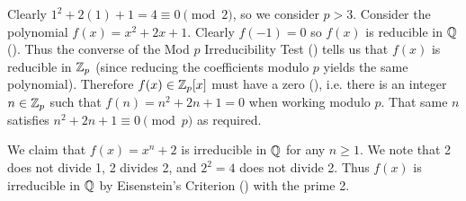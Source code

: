 \begin{questions}
    \item Clearly $1^2 + 2(1) + 1 = 4 \equiv 0 \pmod2$, so we consider $p > 3$. Consider the polynomial $f(x) = x^2 + 2x + 1$. Clearly $f(-1) = 0$ so $f(x)$ is reducible in $\mathbb{Q}$ (). Thus the converse of the Mod $p$ Irreducibility Test () tells us that $f(x)$ is reducible in $\mathbb{Z}_p$ (since reducing the coefficients modulo $p$ yields the same polynomial). Therefore $f(x) \in \mathbb{Z}_p[x]$ must have a zero (), i.e. there is an integer $n \in \mathbb{Z}_p$ such that $f(n) = n^2 + 2n + 1 = 0$ when working modulo $p$. That same $n$ satisfies $n^2 + 2n + 1 \equiv 0 \pmod{p}$ as required.
    
    \item We claim that $f(x) = x^n + 2$ is irreducible in $\mathbb{Q}$ for any $n \geq 1$. We note that 2 does not divide 1, 2 divides 2, and $2^2 = 4$ does not divide 2. Thus $f(x)$ is irreducible in $\mathbb{Q}$ by Eisenstein's Criterion () with the prime 2.
\end{questions}
